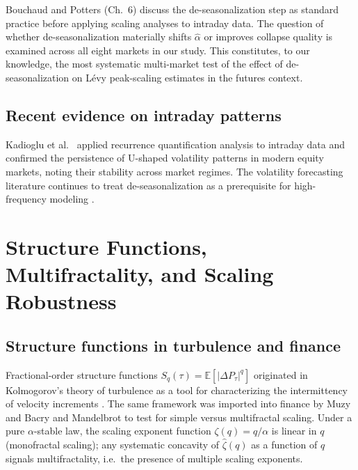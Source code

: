 \documentclass[12pt,a4paper]{article}
\begin{document}
Bouchaud and Potters \cite{BouchaudPotters2003} (Ch.~6) discuss the de-seasonalization step as
standard practice before applying scaling analyses to intraday data. The
question of whether de-seasonalization materially shifts $\hat\alpha$
or improves collapse quality is examined across all eight markets in our
study. This constitutes, to our knowledge, the most systematic multi-market
test of the effect of de-seasonalization on Lévy peak-scaling estimates in the
futures context.

\subsection{Recent evidence on intraday patterns}

Kadioglu et al.\ \cite{Kadioglu2023} applied recurrence quantification analysis to intraday
data and confirmed the persistence of U-shaped volatility patterns in modern
equity markets, noting their stability across market regimes. The volatility
forecasting literature continues to treat de-seasonalization as a prerequisite
for high-frequency modeling \cite{ParkEomKim2022,LiangWan2023}.


\section{Structure Functions, Multifractality, and Scaling Robustness}
\label{sec:structure}

\subsection{Structure functions in turbulence and finance}

Fractional-order structure functions $S_q(\tau) = \mathbb{E}[|\Delta P_\tau|^q]$
originated in Kolmogorov's theory of turbulence as a tool for characterizing
the intermittency of velocity increments \cite{Kolmogorov1941}. The same
framework was imported into finance by Muzy and Bacry \cite{MuzyBacry1993,MuzyBacry1994}
and Mandelbrot \cite{Mandelbrot1997} to test for simple versus multifractal scaling.
Under a pure $\alpha$-stable law, the scaling exponent function $\zeta(q) =
q/\alpha$ is linear in $q$ (monofractal scaling); any systematic concavity of
$\hat\zeta(q)$ as a function of $q$ signals multifractality, i.e.\ the
presence of multiple scaling exponents.
\end{document}
